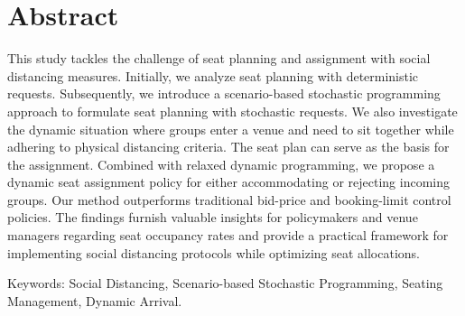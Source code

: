 
\section*{Abstract}
This study tackles the challenge of seat planning and assignment with social distancing measures. Initially, we analyze seat planning with deterministic requests. Subsequently, we introduce a scenario-based stochastic programming approach to formulate seat planning with stochastic requests. We also investigate the dynamic situation where groups enter a venue and need to sit together while adhering to physical distancing criteria. The seat plan can serve as the basis for the assignment. Combined with relaxed dynamic programming, we propose a dynamic seat assignment policy for either accommodating or rejecting incoming groups. Our method outperforms traditional bid-price and booking-limit control policies. The findings furnish valuable insights for policymakers and venue managers regarding seat occupancy rates and provide a practical framework for implementing social distancing protocols while optimizing seat allocations.


Keywords: Social Distancing, Scenario-based Stochastic Programming, Seating Management, Dynamic Arrival.

